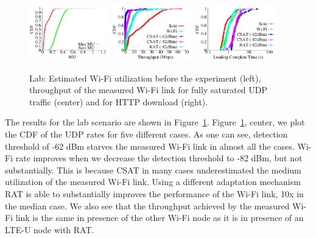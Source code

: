 \begin{figure}[htb!]
 \centering
    \includegraphics[width=0.31\textwidth]{./figures/mu-lab}
    \includegraphics[width=0.31\textwidth]{./figures/office}
    \includegraphics[width=0.31\textwidth]{./figures/officehttp}
    \vspace{-0.3cm}
 \caption{Lab: Estimated Wi-Fi utilization before the experiment (left), throughput of the measured Wi-Fi link for fully saturated UDP traffic (center) and for HTTP download (right).}
  \label{fig:wild_lab}
    \vspace{-0.3cm}
\end{figure}

The results for the lab scenario are shown in Figure~\ref{fig:wild_lab}. 
Figure~\ref{fig:wild_lab}, center, we plot the CDF of the UDP rates for five different cases. 
As one can see, detection threshold of -62 dBm starves the measured Wi-Fi link in almost all the cases. 
Wi-Fi rate improves when we decrease the detection threshold to -82 dBm, but not substantially. 
This is because CSAT in many cases underestimated the medium utilization of the measured Wi-Fi link. 
Using a different adaptation mechanism RAT is able to substantially improves the performance of the Wi-Fi link, 10x in the median case. 
We also see that the throughput achieved by the measured Wi-Fi link is the same in presence of the other Wi-Fi node as it is in presence of an LTE-U node with RAT. 

